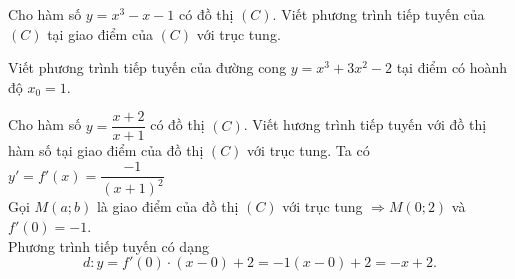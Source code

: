\begin{bt}%
	Cho hàm số $y=x^3-x-1$ có đồ thị $(C)$. Viết phương trình tiếp tuyến của $(C)$ tại giao điểm của $(C)$ với trục tung.
\end{bt}

\begin{bt}%
	Viết phương trình tiếp tuyến của đường cong $y=x^3+3x^2-2$ tại điểm có hoành độ $x_0=1$.
\end{bt}

\begin{bt}%
	Cho hàm số $y=\dfrac{x+2}{x+1}$ có đồ thị $(C)$. Viết hương trình tiếp tuyến với đồ thị hàm số tại giao điểm của đồ thị $(C)$ với trục tung.
	\loigiai
	{
		Ta có $y'=f'(x)=\dfrac{-1}{(x+1)^2}$\\
		Gọi $M(a;b)$ là giao điểm của đồ thị $(C)$ với trục tung $\Rightarrow M(0;2)$ và $f'(0)=-1$.\\
		Phương trình tiếp tuyến có dạng
		\[d\colon y=f'(0)\cdot(x-0)+2=-1(x-0)+2=-x+2.\]
	}
\end{bt}

